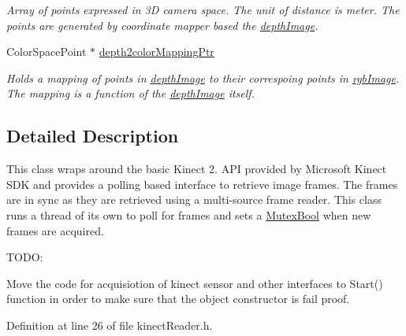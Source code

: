 \begin{DoxyCompactItemize}
\begin{DoxyCompactList}\small\item\em Array of points expressed in 3\+D camera space. The unit of distance is meter. The points are generated by coordinate mapper based the \hyperlink{classpersonal_robotics_1_1_kinect_reader_a4bfa3f18889f77253a76ecd2a6999e60}{depth\+Image}. \end{DoxyCompactList}\item 
\hypertarget{classpersonal_robotics_1_1_kinect_reader_a1c33dad149a819407956d19be1fb2966}{}Color\+Space\+Point $\ast$ \hyperlink{classpersonal_robotics_1_1_kinect_reader_a1c33dad149a819407956d19be1fb2966}{depth2color\+Mapping\+Ptr}\label{classpersonal_robotics_1_1_kinect_reader_a1c33dad149a819407956d19be1fb2966}

\begin{DoxyCompactList}\small\item\em Holds a mapping of points in \hyperlink{classpersonal_robotics_1_1_kinect_reader_a4bfa3f18889f77253a76ecd2a6999e60}{depth\+Image} to their correspoing points in \hyperlink{classpersonal_robotics_1_1_kinect_reader_a32b1651f2e04d3d53a0f1bd6b0b490a1}{rgb\+Image}. The mapping is a function of the \hyperlink{classpersonal_robotics_1_1_kinect_reader_a4bfa3f18889f77253a76ecd2a6999e60}{depth\+Image} itself. \end{DoxyCompactList}\end{DoxyCompactItemize}


\subsection{Detailed Description}
This class wraps around the basic Kinect 2. A\+P\+I provided by Microsoft Kinect S\+D\+K and provides a polling based interface to retrieve image frames. The frames are in sync as they are retrieved using a multi-\/source frame reader. This class runs a thread of its own to poll for frames and sets a \hyperlink{}{Mutex\+Bool} when new frames are acquired.

T\+O\+D\+O\+: \begin{DoxyItemize}
\item {\ttfamily Move} the code for acquisiotion of kinect sensor and other interfaces to Start() function in order to make sure that the object constructor is fail proof. \end{DoxyItemize}


Definition at line 26 of file kinect\+Reader.\+h.



